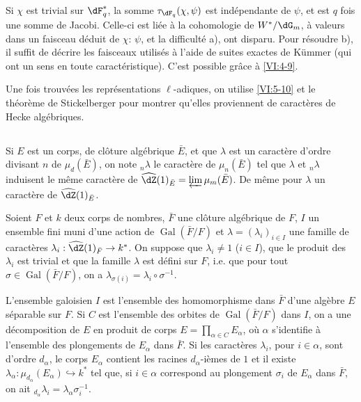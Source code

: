 \documentclass[oneside]{book}
\DeclareMathOperator{\gal}{Gal}
\theoremstyle{sga-source}
\theoremstyle{sga-source-dash}
\theoremstyle{sga-source-dotdash}
\theoremstyle{sga-source-number-note-dash}
\theoremstyle{sga-source-note-number-dotdash}
\theoremstyle{sga-source-example-dotdash}
\theoremstyle{sga-source-inline-number}
\theoremstyle{sga-source-bare-number}
\theoremstyle{sga-source}
\newcommand{\PrintPage}[1]{}\newcommand{\MathPage}[1]{}\newcommand{\PrintCite}[2]{#1}\newcommand{\var}[3]{#1}
\begin{document}
Si $\chi$ est trivial sur $\dF_q^\ast$, la somme $\tau_{\dF_q}(\chi,\psi)$ 
est indépendante de $\psi$, et est $q$ fois une somme de Jacobi. Celle-ci est 
liée à la cohomologie de $W^\ast/\dG_m$, à valeurs dans un faisceau 
déduit de $\chi$: $\psi$, et la difficulté a), ont disparu. Pour 
résoudre b), il suffit de décrire les faisceaux utilisés à l'aide de 
suites exactes de \var{K\"ummer}{Kummer}{S45-SOL-0889} (qui ont un sens en toute caractéristique). C'est 
possible gr\^ace à \ref{VI:4-9}. 

Une fois trouvées les représentations $\ell$-adiques, on utilise 
\ref{VI:5-10} et le théorème de Stickelberger pour montrer qu'elles 
proviennent de caractères de Hecke algébriques. 





\subsection{}\label{VI:6-1}

Si $E$ est un corps, de clôture algébrique $\bar E$, et que $\lambda$ est 
un caractère d'ordre divisant $n$ de $\mu_d(\bar E)$, on note $_n\lambda$ le 
caractère de $\mu_n(\bar E)$ tel que $\lambda$ et $_n \lambda$ induisent le 
même caractère de $\widehat\dZ(1)_{\bar E} = \varprojlim \mu_m(\bar E)$. De 
même pour $\lambda$ un caractère de $\widehat\dZ(1)_{\bar E}$. 

Soient $F$ et $k$ deux corps de nombres, $\bar F$ une clôture algébrique de 
$F$, $I$ un ensemble fini muni d'une action de $\gal(\bar F/F)$ et 
$\lambda=(\lambda_i)_{i\in I}$ une famille de caractères 
$\lambda_i:\widehat\dZ(1)_{\bar F} \to k^\ast$. On suppose que 
$\lambda_i\ne 1$ ($i\in I$), que \PrintPage{214}
le produit des $\lambda_i$ est trivial et que 
\var{la famille $\lambda$ est défini}{la famille $\lambda$ est définie}{S45-SOL-0892} sur $F$, i.e. que pour tout 
$\sigma\in \gal(\bar F/F)$, on a 
$\lambda_{\sigma(i)}=\lambda_i\circ \sigma^{-1}$. 

L'ensemble galoisien $I$ est \var{l'ensemble des homomorphisme dans}{l'ensemble des homomorphismes dans}{S45-SOL-0893} $\bar F$ d'une 
alg\`ebre $E$ séparable sur $F$. Si $C$ est l'ensemble des orbites de 
$\gal(\bar F/F)$ dans $I$, on a une décomposition de $E$ en produit de corps 
$E=\prod_{\alpha\in C} E_\alpha$, où $\alpha$ s'identifie à l'ensemble des 
plongements de $E_\alpha$ dans $\bar F$. Si les caractères $\lambda_i$, pour 
$i\in \alpha$, sont d'ordre $d_\alpha$, le corps $E_\alpha$ contient les 
racines $d_\alpha$-ièmes de $1$ et il existe 
$\lambda_\alpha:\mu_{d_\alpha}(E_\alpha) \hookrightarrow k^\ast$  tel que, si 
$i\in \alpha$ correspond au plongement $\sigma_i$ de $E_\alpha$ dans $\bar F$, 
on ait $_{d_\alpha} \lambda_i = \lambda_\alpha \sigma_i^{-1}$. 
\end{document}
